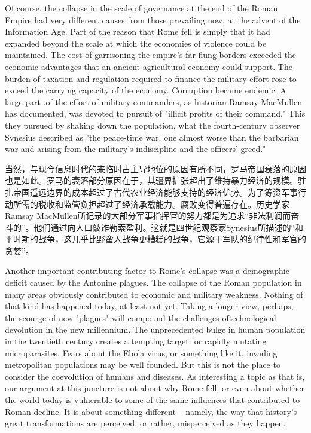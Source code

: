 \begin{paracol}{2}
\switchcolumn*
Of course, the collapse in the scale of governance at the end of the Roman Empire had very different causes from those prevailing now, at the advent of the Information Age. Part of the reason that Rome fell is simply that it had expanded beyond the scale at which the economies of violence could be maintained. The cost of garrisoning the empire's far-flung borders exceeded the economic advantages that an ancient agricultural economy could support. The burden of taxation and regulation required to finance the military effort rose to exceed the carrying capacity of the economy. Corruption became endemic. A large part .of the effort of military commanders, as historian Ramsay MacMullen has documented, was devoted to pursuit of "illicit profits of their command." This they pursued by shaking down the population, what the fourth-century observer Synesius described as "the peace-time war, one almost worse than the barbarian war and arising from the military's indiscipline and the officers' greed."  
  
\switchcolumn
当然，与现今信息时代的来临时占主导地位的原因有所不同，罗马帝国衰落的原因也是如此。罗马的衰落部分原因在于，其疆界扩张超出了维持暴力经济的规模。驻扎帝国遥远边界的成本超过了古代农业经济能够支持的经济优势。为了筹资军事行动所需的税收和监管负担超过了经济承载能力。腐败变得普遍存在。历史学家Ramsay MacMullen所记录的大部分军事指挥官的努力都是为追求“非法利润而奋斗的”。他们通过向人口敲诈勒索盈利。这就是四世纪观察家Synesius所描述的“和平时期的战争，这几乎比野蛮人战争更糟糕的战争，它源于军队的纪律性和军官的贪婪”。

\switchcolumn*
Another important contributing factor to Rome's collapse was a demographic deficit caused by the Antonine plagues. The collapse of the Roman population in many areas obviously contributed to economic and military weakness. Nothing of that kind has happened today, at least not yet. Taking a longer view, perhaps, the scourge of new "plagues" will compound the challenges oftechnological devolution in the new millennium. The unprecedented bulge in human population in the twentieth century creates a tempting target for rapidly mutating microparasites. Fears about the Ebola virus, or something like it, invading metropolitan populations may be well founded. But this is not the place to consider the coevolution of humans and diseases. As interesting a topic as that is, our argument at this juncture is not about why Rome fell, or even about whether the world today is vulnerable to some of the same influences that contributed to Roman decline. It is about something different -- namely, the way that history's great transformations are perceived, or rather, misperceived as they happen.


\end{paracol}
